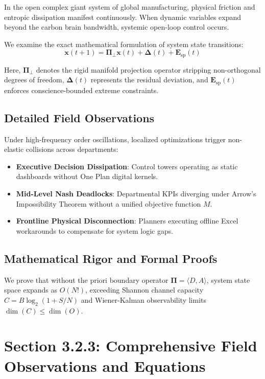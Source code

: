 \documentclass[12pt,a4paper,oneside]{book}
\begin{document}
In the open complex giant system of global manufacturing, physical friction and entropic dissipation manifest continuously. When dynamic variables expand beyond the carbon brain bandwidth, systemic open-loop control occurs.

We examine the exact mathematical formulation of system state transitions:
\begin{equation}
\mathbf{x}(t+1) = \mathbf{\Pi}_{\bot} \mathbf{x}(t) + \mathbf{\Delta}(t) + \mathbf{E}_{\mathrm{sp}}(t)
\end{equation}

Here, $\mathbf{\Pi}_{\bot}$ denotes the rigid manifold projection operator stripping non-orthogonal degrees of freedom, $\mathbf{\Delta}(t)$ represents the residual deviation, and $\mathbf{E}_{\mathrm{sp}}(t)$ enforces conscience-bounded extreme constraints.

\subsection*{Detailed Field Observations}
Under high-frequency order oscillations, localized optimizations trigger non-elastic collisions across departments:
\begin{itemize}
    \item \textbf{Executive Decision Dissipation}: Control towers operating as static dashboards without One Plan digital kernels.
    \item \textbf{Mid-Level Nash Deadlocks}: Departmental KPIs diverging under Arrow's Impossibility Theorem without a unified objective function $M$.
    \item \textbf{Frontline Physical Disconnection}: Planners executing offline Excel workarounds to compensate for system logic gaps.
\end{itemize}

\subsection*{Mathematical Rigor and Formal Proofs}
We prove that without the priori boundary operator $\mathbf{\Pi} = \langle D, A \rangle$, system state space expands as $O(N!)$, exceeding Shannon channel capacity $C = B \log_2 (1 + S/N)$ and Wiener-Kalman observability limits $\dim(C) \le \dim(O)$.
\clearpage
\section{Section 3.2.3: Comprehensive Field Observations and Equations}
\end{document}
